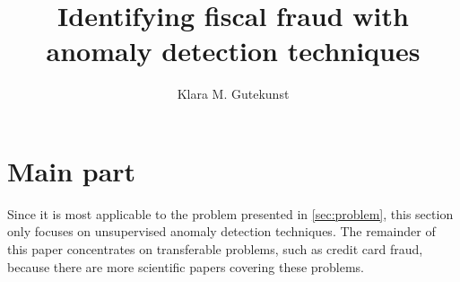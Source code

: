 \documentclass[runningheads]{llncs}
\begin{document}
\title{Identifying fiscal fraud with anomaly detection techniques}
\author{Klara M. Gutekunst}

\maketitle





\section{Main part}
\label{sec:main_part}
Since it is most applicable to the problem presented in \autoref{sec:problem}, this section only focuses on unsupervised anomaly detection techniques.
The remainder of this paper concentrates on transferable problems, such as credit card fraud, because there are more scientific papers covering these problems.









\printbibliography
\end{document}
